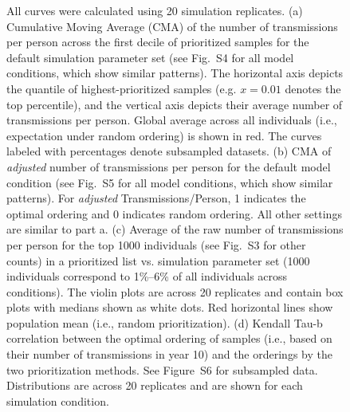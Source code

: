 \documentclass[a4paper,10pt]{article}
\newcommand{\PLWH}{sample\xspace}
\begin{document}
\begin{figure}[!tp]
{All curves were calculated using 20 simulation replicates.
(a) Cumulative Moving Average (CMA) of the number of transmissions per person across the first decile of prioritized \PLWH{s} for the default simulation parameter set (see Fig.~S4 for all model conditions, which show similar patterns).
The horizontal axis depicts the quantile of highest-prioritized \PLWH{s} (e.g. $x=0.01$ denotes the top percentile), and the vertical axis depicts their average number of transmissions per person.
Global average across all individuals (i.e., expectation under random ordering) is shown in red.
The curves labeled with percentages denote subsampled datasets.
(b) CMA of \textit{adjusted} number of transmissions per person for the default model condition (see Fig.~S5 for all model conditions, which show similar patterns). 
For \textit{adjusted} Transmissions/Person, 1 indicates the optimal ordering and 0 indicates  random ordering.
All other settings are similar to part a. 
(c) Average of the raw number of transmissions per person for the top 1000 individuals (see Fig.~S3 for other counts) in a prioritized list vs. simulation parameter set (1000 individuals correspond to 1\%--6\% of all individuals across conditions). The violin plots are across 20 replicates and contain box plots with medians shown as white dots.
Red horizontal lines show population mean (i.e., random prioritization).
(d) Kendall Tau-b correlation between the optimal ordering of \PLWH{s} (i.e., based on their number of transmissions in year 10) and the orderings by the two prioritization methods.
See Figure~S6 for subsampled data. 
Distributions are across 20 replicates and are shown for each simulation condition. 
}\label{fig:efficacy-main}
\end{figure}











\end{document}
